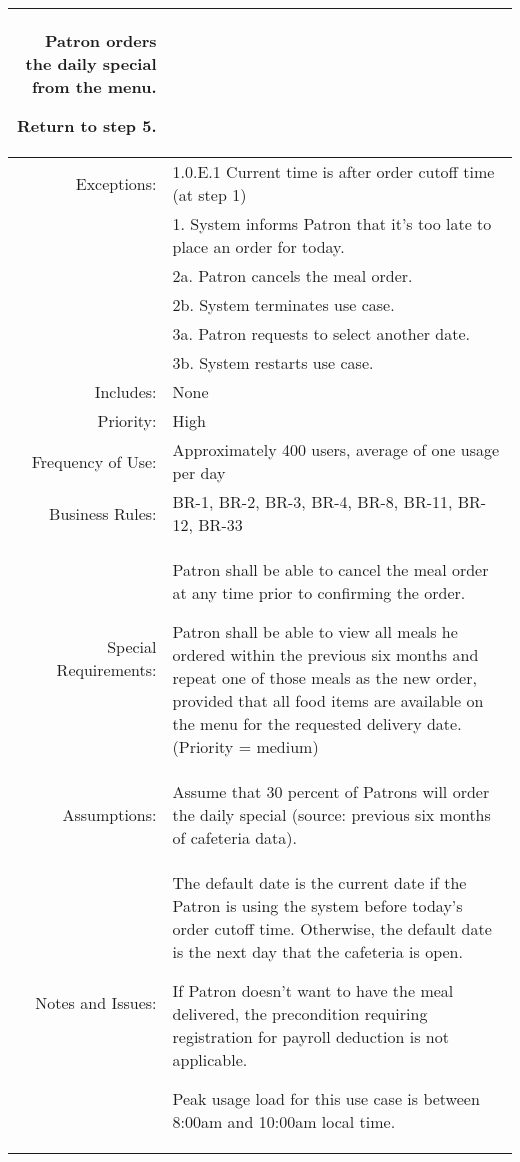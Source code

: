 \documentclass[12pt,oneside,letterpaper]{article}
\newenvironment{packed_enumerate}{ %
\vspace{-7mm}
\begin{enumerate}
  \setlength{\itemsep}{0pt}
  \setlength{\parskip}{0pt}
  \setlength{\parsep}{0pt}
}{\end{enumerate}
\vspace{-8mm}}
\begin{document}
\begin{longtable}{|r|p{3.8in}|}
\begin{packed_enumerate}
\item Patron orders the daily special from the menu.
\item Return to step 5.
\end{packed_enumerate}\\
\hline
Exceptions:&1.0.E.1 Current time is after order cutoff time (at step 1)\\
&1. 	System informs Patron that it's too late to place an order for today.\\
&2a.	Patron cancels the meal order.\\
&2b.	System terminates use case.\\
&3a.	Patron requests to select another date.\\
&3b.	System restarts use case.\\
\hline
Includes:&None\\
\hline
Priority:&High\\
\hline
Frequency of Use:&Approximately 400 users, average of one usage per day\\
\hline
Business Rules:&BR-1, BR-2, BR-3, BR-4, BR-8, BR-11, BR-12, BR-33\\
\hline
Special Requirements:&
\begin{packed_enumerate}
\item Patron shall be able to cancel the meal order at any time prior to confirming the order.
\item Patron shall be able to view all meals he ordered within the previous six months and repeat one of those meals as the new order, provided that all food items are available on the menu for the requested delivery date. (Priority = medium)
\end{packed_enumerate}\\
\hline
Assumptions:&Assume that 30 percent of Patrons will order the daily special (source: previous six months of cafeteria data).\\
\hline
Notes and Issues:&
\begin{packed_enumerate}
\item The default date is the current date if the Patron is using the system before today's order cutoff time. Otherwise, the default date is the next day that the cafeteria is open.
\item If Patron doesn't want to have the meal delivered, the precondition requiring registration for payroll deduction is not applicable.
\item Peak usage load for this use case is between 8:00am and 10:00am local time.
\end{packed_enumerate}\\
\hline
\end{longtable}
\end{document}
